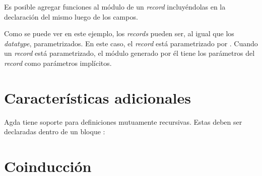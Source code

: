 Es posible agregar funciones al módulo de un \textit{record} incluyéndolas en la declaración del mismo luego de los campos. 


Como se puede ver en este ejemplo, los \textit{records} pueden ser, al igual que los \textit{datatype}, parametrizados. En este caso, el \textit{record}  está parametrizado por . Cuando un \textit{record} está parametrizado, el módulo generado por él tiene los parámetros del \textit{record} como parámetros implícitos.

\section{Características adicionales}

Agda tiene soporte para definiciones mutuamente recursivas. Estas deben ser declaradas dentro de un bloque :


\section{Coinducción}


